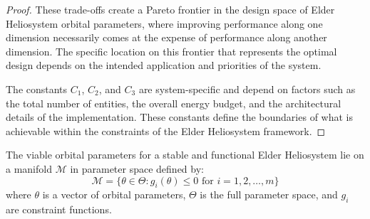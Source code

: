 \begin{proof}
These trade-offs create a Pareto frontier in the design space of Elder Heliosystem orbital parameters, where improving performance along one dimension necessarily comes at the expense of performance along another dimension. The specific location on this frontier that represents the optimal design depends on the intended application and priorities of the system.

The constants $C_1$, $C_2$, and $C_3$ are system-specific and depend on factors such as the total number of entities, the overall energy budget, and the architectural details of the implementation. These constants define the boundaries of what is achievable within the constraints of the Elder Heliosystem framework.
\end{proof}

\begin{theorem}
The viable orbital parameters for a stable and functional Elder Heliosystem lie on a manifold $\mathcal{M}$ in parameter space defined by:
\begin{equation}
\mathcal{M} = \{\theta \in \Theta : g_i(\theta) \leq 0 \text{ for } i = 1,2,\ldots,m\}
\end{equation}
where $\theta$ is a vector of orbital parameters, $\Theta$ is the full parameter space, and $g_i$ are constraint functions.
\end{theorem}

